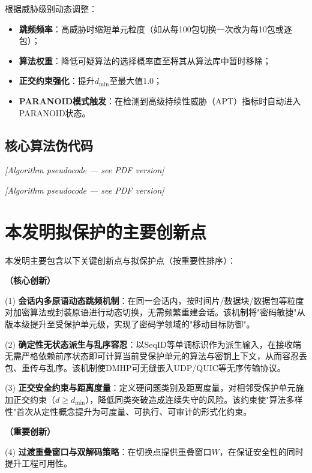 ﻿\documentclass[12pt,a4paper]{article}
\begin{document}
根据威胁级别动态调整：

\begin{itemize}
    \item \textbf{跳频频率}：高威胁时缩短单元粒度（如从每100包切换一次改为每10包或逐包）；
    \item \textbf{算法权重}：降低可疑算法的选择概率直至将其从算法库中暂时移除；
    \item \textbf{正交约束强化}：提升$d_{\min}$至最大值1.0；
    \item \textbf{PARANOID模式触发}：在检测到高级持续性威胁（APT）指标时自动进入PARANOID状态。
\end{itemize}

\subsection{核心算法伪代码}

\textit{[Algorithm pseudocode — see PDF version]}

\textit{[Algorithm pseudocode — see PDF version]}

\section{本发明拟保护的主要创新点}

本发明主要包含以下关键创新点与拟保护点（按重要性排序）：

\textbf{（核心创新）}

(1) \textbf{会话内多原语动态跳频机制}：在同一会话内，按时间片/数据块/数据包等粒度对加密算法或封装原语进行动态切换，无需频繁重建会话。该机制将"密码敏捷"从版本级提升至受保护单元级，实现了密码学领域的"移动目标防御"。

(2) \textbf{确定性无状态派生与乱序容忍}：以$\text{SeqID}$等单调标识作为派生输入，在接收端无需严格依赖前序状态即可计算当前受保护单元的算法与密钥上下文，从而容忍丢包、重传与乱序。该机制使DMHP可无缝嵌入UDP/QUIC等无序传输协议。

(3) \textbf{正交安全约束与距离度量}：定义硬问题类别及距离度量，对相邻受保护单元施加正交约束（$d \geq d_{\min}$），降低同类突破造成连续失守的风险。该约束使"算法多样性"首次从定性概念提升为可度量、可执行、可审计的形式化约束。

\textbf{（重要创新）}

(4) \textbf{过渡重叠窗口与双解码策略}：在切换点提供重叠窗口$W$，在保证安全性的同时提升工程可用性。
\end{document}
